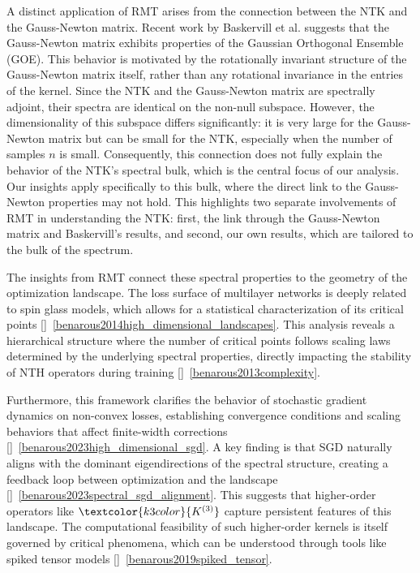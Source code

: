A distinct application of RMT arises from the connection between the NTK and the Gauss-Newton matrix. Recent work by Baskervill et al. suggests that the Gauss-Newton matrix exhibits properties of the Gaussian Orthogonal Ensemble (GOE). This behavior is motivated by the rotationally invariant structure of the Gauss-Newton matrix itself, rather than any rotational invariance in the entries of the kernel. Since the NTK and the Gauss-Newton matrix are spectrally adjoint, their spectra are identical on the non-null subspace. However, the dimensionality of this subspace differs significantly: it is very large for the Gauss-Newton matrix but can be small for the NTK, especially when the number of samples $n$ is small. Consequently, this connection does not fully explain the behavior of the NTK's spectral bulk, which is the central focus of our analysis. Our insights apply specifically to this bulk, where the direct link to the Gauss-Newton properties may not hold. This highlights two separate involvements of RMT in understanding the NTK: first, the link through the Gauss-Newton matrix and Baskervill's results, and second, our own results, which are tailored to the bulk of the spectrum.

The insights from RMT connect these spectral properties to the geometry of the optimization landscape. The loss surface of multilayer networks is deeply related to spin glass models, which allows for a statistical characterization of its critical points []~\ref{benarous2014high_dimensional_landscapes}. This analysis reveals a hierarchical structure where the number of critical points follows scaling laws determined by the underlying spectral properties, directly impacting the stability of NTH operators during training []~\ref{benarous2013complexity}.

Furthermore, this framework clarifies the behavior of stochastic gradient dynamics on non-convex losses, establishing convergence conditions and scaling behaviors that affect finite-width corrections []~\ref{benarous2023high_dimensional_sgd}. A key finding is that SGD naturally aligns with the dominant eigendirections of the spectral structure, creating a feedback loop between optimization and the landscape []~\ref{benarous2023spectral_sgd_alignment}. This suggests that higher-order operators like $\textcolor{k3color}{K^{(3)}}$ capture persistent features of this landscape. The computational feasibility of such higher-order kernels is itself governed by critical phenomena, which can be understood through tools like spiked tensor models []~\ref{benarous2019spiked_tensor}.

